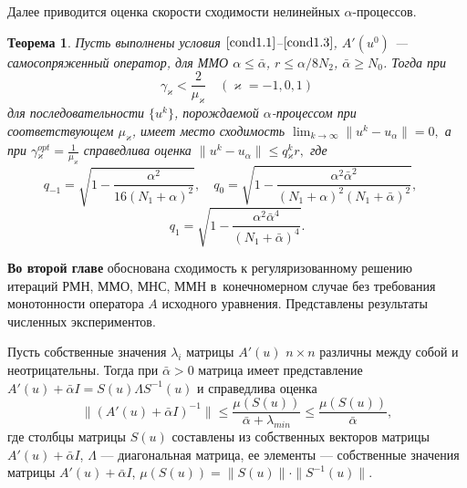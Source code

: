 \documentclass[%
autoref,     %
href,        %
facsimile,   %
colorlinks,  %
]{disser}
\newtheorem{theorem}{Теорема}
\begin{document}
Далее приводится оценка скорости сходимости нелинейных $\alpha$-процессов.
\begin{theorem}\label{teo3.2}
	Пусть выполнены условия $\eqref{cond1.1}$--$\eqref{cond1.3}$, $A'(u^0)$ --- самосопряженный оператор, для ММО $\alpha \leqslant \bar\alpha$,  $r\leqslant \alpha/8N_2$, $\bar\alpha \geqslant N_0$.  Тогда при
	$$\gamma _\varkappa <\frac{2}{\mu _\varkappa}\quad (\varkappa=-1,0,1)$$
	для последовательности $\{u^k\}$, порождаемой $\alpha$-процессом при соответствующем $\mu_\varkappa$, имеет место сходимость $\lim_{k\to\infty}\|u^k-u_\alpha\|=0, $ а при 
	$\gamma{_\varkappa^{opt}}=\frac{1}{\mu_\varkappa}$
	справедлива оценка $\|u^k-u_\alpha\|\leqslant q{_\varkappa^k}r,$ где
	$$
	q_{-1}=\sqrt{1-\frac{\alpha^2}{16(N_1+\alpha)^2}}, \quad q_0=\sqrt{1-\frac{\alpha^2\bar\alpha^2}{(N_1+\alpha)^2(N_1+\bar\alpha)^2}}, \quad $$$$q_1=\sqrt{1-\frac{\alpha^2\bar\alpha^4}{(N_1+\bar\alpha)^4}}.
	$$
\end{theorem}


\textbf{Во второй главе} обоснована сходимость к регуляризованному решению итераций РМН, ММО, МНС, ММН в~конечномерном случае без требования монотонности оператора $A$ исходного уравнения. Представлены результаты численных экспериментов.

Пусть собственные значения $\lambda _i$ матрицы $A'(u)$ $n\times n$ различны между собой и неотрицательны. Тогда при $\bar\alpha>0$ матрица имеет представление $A'(u)+\bar\alpha I =S(u)\Lambda S^{-1}(u)$ и справедлива оценка
\begin{equation}\label{est4.1}
\|(A'(u)+\bar\alpha I)^{-1}\|\leqslant \frac{\mu (S(u))}{\bar\alpha+\lambda_{min}} \leqslant \frac{\mu(S(u))}{\bar\alpha},
\end{equation}
где столбцы матрицы $S(u)$ составлены из собственных векторов матрицы $A'(u)+\bar\alpha I$, $\Lambda$ --- диагональная матрица, ее элементы --- собственные значения матрицы $A'(u)+\bar\alpha I$, $\mu(S(u))=\|S(u)\|\cdot\|S^{-1}(u)\|$.
\end{document}
